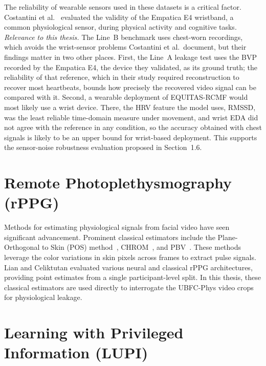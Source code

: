 The reliability of wearable sensors used in these datasets is a critical factor. Costantini et al.~\cite{costantini2023} evaluated the validity of the Empatica E4 wristband, a common physiological sensor, during physical activity and cognitive tasks.
\textit{Relevance to this thesis.} The Line~B benchmark uses chest-worn recordings, which avoids the wrist-sensor problems Costantini et al.\ document, but their findings matter in two other places. First, the Line~A leakage test uses the BVP recorded by the Empatica E4, the device they validated, as its ground truth; the reliability of that reference, which in their study required reconstruction to recover most heartbeats, bounds how precisely the recovered video signal can be compared with it. Second, a wearable deployment of EQUITAS-RCMF would most likely use a wrist device. There, the HRV feature the model uses, RMSSD, was the least reliable time-domain measure under movement, and wrist EDA did not agree with the reference in any condition, so the accuracy obtained with chest signals is likely to be an upper bound for wrist-based deployment. This supports the sensor-noise robustness evaluation proposed in Section~1.6.

\section{Remote Photoplethysmography (rPPG)}

Methods for estimating physiological signals from facial video have seen significant advancement. Prominent classical estimators include the Plane-Orthogonal to Skin (POS) method~\cite{wang2017}, CHROM~\cite{dehaan2013}, and PBV~\cite{dehaan2014}. These methods leverage the color variations in skin pixels across frames to extract pulse signals. Lian and Celiktutan evaluated various neural and classical rPPG architectures, providing point estimates from a single participant-level split. In this thesis, these classical estimators are used directly to interrogate the UBFC-Phys video crops for physiological leakage.

\section{Learning with Privileged Information (LUPI)}

